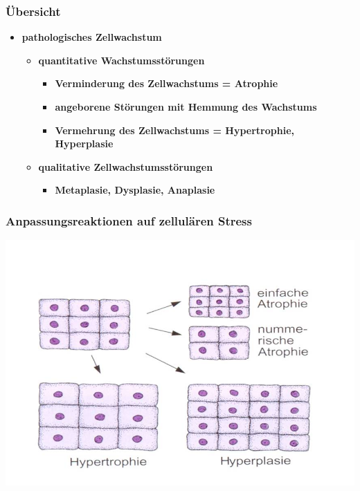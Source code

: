 \subsubsection{Übersicht}
	\begin{itemize}
		\item \textbf{pathologisches Zellwachstum}
			\begin{itemize}
				\item \textbf{quantitative Wachstumsstörungen}
					\begin{itemize}
						\item \textbf{Verminderung des Zellwachstums = Atrophie}
						\item \textbf{angeborene Störungen mit Hemmung des Wachstums}
						\item \textbf{Vermehrung des Zellwachstums = Hypertrophie, Hyperplasie}
					\end{itemize}
				\item \textbf{qualitative Zellwachstumsstörungen}
					\begin{itemize}
						\item \textbf{Metaplasie, Dysplasie, Anaplasie}
					\end{itemize}
			\end{itemize}
	\end{itemize}

\subsubsection{Anpassungsreaktionen auf zellulären Stress}
	\begin{center}
		\includegraphics[scale=0.7]{Picture1.jpg}
	\end{center}
\pagebreak
